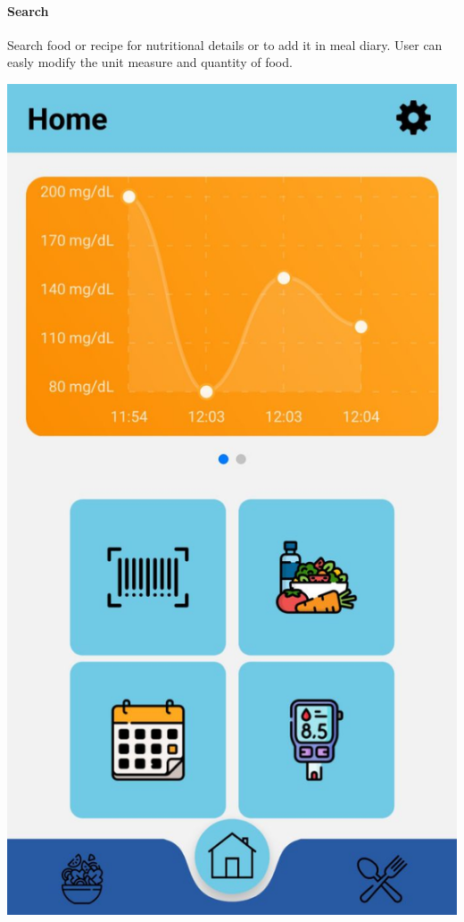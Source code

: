 \documentclass[12pt,hidelinks]{article}
\begin{document}
	\paragraph{Search}
    Search food or recipe for nutritional details or to add it in meal diary. User can easly modify the unit measure and quantity of food.
	\begin{center}

		\includegraphics[scale=0.2]{screenshot3}
	\end{center}
\end{document}

